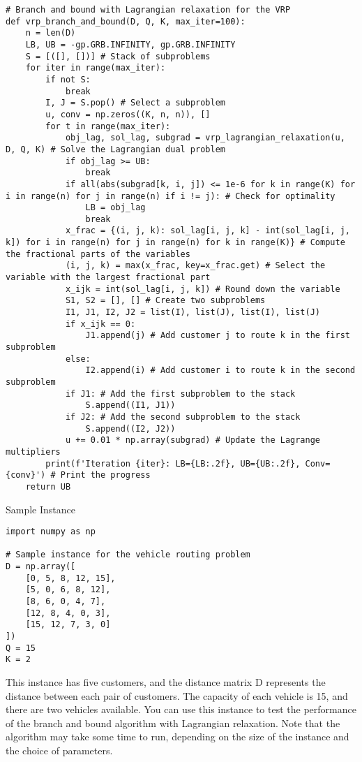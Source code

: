 \begin{verbatim}
# Branch and bound with Lagrangian relaxation for the VRP
def vrp_branch_and_bound(D, Q, K, max_iter=100):
    n = len(D)
    LB, UB = -gp.GRB.INFINITY, gp.GRB.INFINITY
    S = [([], [])] # Stack of subproblems
    for iter in range(max_iter):
        if not S:
            break
        I, J = S.pop() # Select a subproblem
        u, conv = np.zeros((K, n, n)), []
        for t in range(max_iter):
            obj_lag, sol_lag, subgrad = vrp_lagrangian_relaxation(u, D, Q, K) # Solve the Lagrangian dual problem
            if obj_lag >= UB:
                break
            if all(abs(subgrad[k, i, j]) <= 1e-6 for k in range(K) for i in range(n) for j in range(n) if i != j): # Check for optimality
                LB = obj_lag
                break
            x_frac = {(i, j, k): sol_lag[i, j, k] - int(sol_lag[i, j, k]) for i in range(n) for j in range(n) for k in range(K)} # Compute the fractional parts of the variables
            (i, j, k) = max(x_frac, key=x_frac.get) # Select the variable with the largest fractional part
            x_ijk = int(sol_lag[i, j, k]) # Round down the variable
            S1, S2 = [], [] # Create two subproblems
            I1, J1, I2, J2 = list(I), list(J), list(I), list(J)
            if x_ijk == 0:
                J1.append(j) # Add customer j to route k in the first subproblem
            else:
                I2.append(i) # Add customer i to route k in the second subproblem
            if J1: # Add the first subproblem to the stack
                S.append((I1, J1))
            if J2: # Add the second subproblem to the stack
                S.append((I2, J2))
            u += 0.01 * np.array(subgrad) # Update the Lagrange multipliers
        print(f'Iteration {iter}: LB={LB:.2f}, UB={UB:.2f}, Conv={conv}') # Print the progress
    return UB
\end{verbatim}

Sample Instance
\begin{verbatim}
import numpy as np

# Sample instance for the vehicle routing problem
D = np.array([
    [0, 5, 8, 12, 15],
    [5, 0, 6, 8, 12],
    [8, 6, 0, 4, 7],
    [12, 8, 4, 0, 3],
    [15, 12, 7, 3, 0]
])
Q = 15
K = 2
\end{verbatim}

This instance has five customers, and the distance matrix D represents the distance between each pair of customers. The capacity of each vehicle is 15, and there are two vehicles available. You can use this instance to test the performance of the branch and bound algorithm with Lagrangian relaxation. Note that the algorithm may take some time to run, depending on the size of the instance and the choice of parameters.
